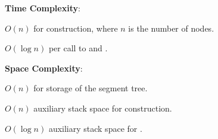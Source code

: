 \textbf{Time Complexity}:
\begin{compactitem}
  \item $O(n)$ for construction, where $n$ is the number of nodes.
  \item $O(\log n)$ per call to  and .
\end{compactitem}

\textbf{Space Complexity}:
\begin{compactitem}
  \item $O(n)$ for storage of the segment tree.
  \item $O(n)$ auxiliary stack space for construction.
  \item $O(\log n)$ auxiliary stack space for .
\end{compactitem}

